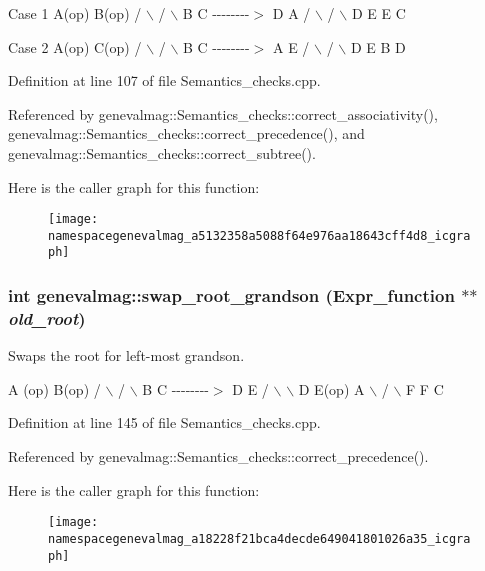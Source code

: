 Case 1 A(op) B(op) / $\backslash$ / $\backslash$ B C -\/-\/-\/-\/-\/-\/-\/-\/$>$ D A / $\backslash$ / $\backslash$ D E E C

Case 2 A(op) C(op) / $\backslash$ / $\backslash$ B C -\/-\/-\/-\/-\/-\/-\/-\/$>$ A E / $\backslash$ / $\backslash$ D E B D 

Definition at line 107 of file Semantics\_\-checks.cpp.



Referenced by genevalmag::Semantics\_\-checks::correct\_\-associativity(), genevalmag::Semantics\_\-checks::correct\_\-precedence(), and genevalmag::Semantics\_\-checks::correct\_\-subtree().



Here is the caller graph for this function:\nopagebreak
\begin{figure}[H]
\begin{center}
\leavevmode
\texttt{[image: namespacegenevalmag\_a5132358a5088f64e976aa18643cff4d8\_icgraph]}
\end{center}
\end{figure}


\hypertarget{namespacegenevalmag_a18228f21bca4decde649041801026a35}{
\subsubsection[{swap\_\-root\_\-grandson}]{\setlength{\rightskip}{0pt plus 5cm}int genevalmag::swap\_\-root\_\-grandson (Expr\_\-function $\ast$$\ast$ {\em old\_\-root})}}
\label{namespacegenevalmag_a18228f21bca4decde649041801026a35}
Swaps the root for left-\/most grandson.

A (op) B(op) / $\backslash$ / $\backslash$ B C -\/-\/-\/-\/-\/-\/-\/-\/$>$ D E / $\backslash$ $\backslash$ D E(op) A $\backslash$ / $\backslash$ F F C 

Definition at line 145 of file Semantics\_\-checks.cpp.



Referenced by genevalmag::Semantics\_\-checks::correct\_\-precedence().



Here is the caller graph for this function:\nopagebreak
\begin{figure}[H]
\begin{center}
\leavevmode
\texttt{[image: namespacegenevalmag\_a18228f21bca4decde649041801026a35\_icgraph]}
\end{center}
\end{figure}


